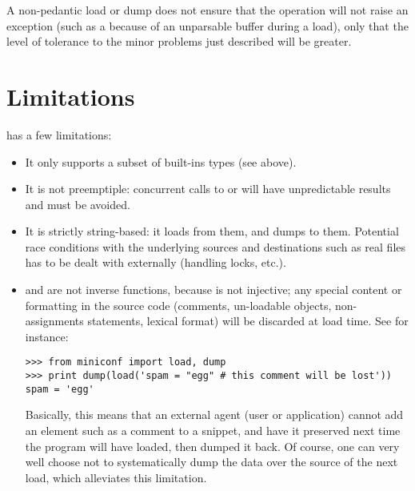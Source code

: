 \documentclass{howto}
\begin{document}
A non-pedantic load or dump does not ensure that the operation will not raise an
exception (such as a  because of an unparsable buffer
during a load), only that the level of tolerance to the minor problems just
described will be greater.

\section{Limitations}

 has a few limitations:

\begin{itemize}
\item
It only supports a subset of built-ins types (see above).

\item
It is not preemptiple: concurrent calls to  or 
will have unpredictable results and must be avoided.

\item
It is strictly string-based: it loads from them, and dumps to them. Potential
race conditions with the underlying sources and destinations such as real files
has to be dealt with externally (handling locks, etc.).

\item
{} and  are not inverse functions, because
 is not injective; any special content or formatting in the
source code (comments, un-loadable objects, non-assignments statements, lexical
format) will be discarded at load time. See for instance:

\begin{verbatim}
>>> from miniconf import load, dump
>>> print dump(load('spam = "egg" # this comment will be lost'))
spam = 'egg'
\end{verbatim}

Basically, this means that an external agent (user or application)
cannot add an element such as a comment to a snippet, and have it
preserved next time the program will have loaded, then dumped it
back. Of course, one can very well choose not to systematically dump
the data over the source of the next load, which alleviates this
limitation.
\end{itemize}
\end{document}
